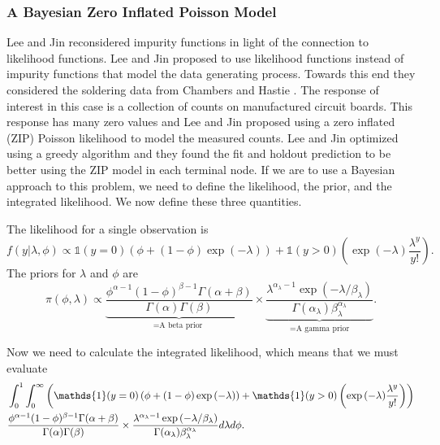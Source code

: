  \subsubsection{A Bayesian Zero Inflated Poisson Model}
 
 Lee and Jin \cite{lee2006decision} reconsidered impurity functions in light of the connection to likelihood functions. Lee and Jin \cite{lee2006decision} proposed to use likelihood functions instead of impurity functions that model the data generating process. Towards this end they considered the soldering data from Chambers and Hastie \cite{chambers1992statistical}. The response of interest in this case is a collection of counts on manufactured circuit boards. This response has many zero values and Lee and Jin \cite{lee2006decision} proposed using a zero inflated (ZIP) Poisson likelihood to model the measured counts. Lee and Jin \cite{lee2006decision} optimized using a greedy algorithm and they found the fit and holdout prediction to be better using the ZIP model in each terminal node. If we are to use a Bayesian approach to this problem, we need to define the likelihood, the prior, and the integrated likelihood. We now define these three quantities.
 
 The likelihood for a single observation is 
 \begin{equation}
 f(y\vert \lambda, \phi) \propto \mathds{1}(y=0)\left(\phi + (1-\phi)\exp{(-\lambda)}\right) + \mathds{1}(y>0)\left(\exp{(-\lambda)}\frac{\lambda^y}{y!}\right).
 \end{equation}
 The priors for $\lambda$ and $\phi$ are
 \begin{equation}
 \pi(\phi, \lambda)\propto \underbrace{\frac{\phi^{\alpha-1}(1-\phi)^{\beta-1}\Gamma(\alpha+\beta)}{\Gamma(\alpha)\Gamma(\beta)}}_{=\text{A beta prior }} \times \underbrace{\frac{ \lambda^{\alpha_{\lambda}-1}\exp{(-\lambda/\beta_{\lambda})} }{\Gamma(\alpha_{\lambda})\beta_{\lambda}^{\alpha_{\lambda}}}}_{=\text{A gamma prior}}.
 \end{equation}

 Now we need to calculate the integrated likelihood, which means that we must evaluate 
 \begin{align} \hspace{-.9in}
 &\int_0^1\int_0^\infty \left(\mathds{1}(y=0)\left(\phi + (1-\phi)\exp{(-\lambda)}\right) + \mathds{1}(y>0)\left(\exp{(-\lambda)}\frac{\lambda^y}{y!}\right)\right) \\ \nonumber
 & \frac{\phi^{\alpha-1}(1-\phi)^{\beta-1}\Gamma(\alpha+\beta)}{\Gamma(\alpha)\Gamma(\beta)} \times \frac{ \lambda^{\alpha_{\lambda}-1}\exp{(-\lambda/\beta_{\lambda})} }{\Gamma(\alpha_{\lambda})\beta_{\lambda}^{\alpha_{\lambda}}}d\lambda d\phi.
 \end{align}
 

